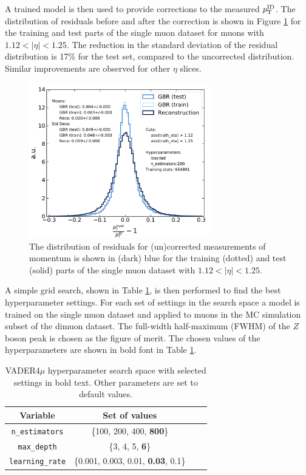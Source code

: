 A trained model is then used to provide corrections to the
measured $p_{\text{T}}^\text{ID}$. The distribution of residuals before and
after the correction is shown in Figure \ref{fig:muon:vader-single}
for the training and test parts of the single muon dataset for muons
with $1.12 < |\eta| < 1.25$. The reduction in the standard deviation
of the residual distribution is 17\% for the test set, compared to
the uncorrected distribution. Similar improvements are observed for
other $\eta$ slices.
\begin{figure}[h!]
  \centering
  \includegraphics[width=0.7\textwidth]{figures/muons/vader-single}
  \caption[VADER4$\mu$ correction on the single muon dataset]
  {The distribution of residuals for (un)corrected measurements of
  momentum is shown in (dark) blue for the training (dotted)
  and test (solid) parts of the single muon dataset with
  $1.12 < |\eta| < 1.25$.}
  \label{fig:muon:vader-single}
\end{figure}
A simple grid search, shown in Table \ref{tab:muon:grid}, is then
performed to find the best hyperparameter settings. For each 
set of settings in the search space a 
model is trained on the single muon dataset and applied to muons
in the MC simulation subset of the dimuon dataset. The full-width
half-maximum (FWHM) of the $Z$ boson peak is chosen as the figure of
merit. The chosen values of the hyperparameters are shown in bold
font in Table \ref{tab:muon:grid}.
\begin{table}[h]
\centering
\caption{VADER4$\mu$ hyperparameter search space with selected settings
in bold text. Other parameters are set to default values.}
\label{tab:muon:grid}
\begin{tabular}{c c c c }
\toprule
\midrule
Variable & Set of values \\
\midrule
\texttt{n\_estimators} & \{100, 200, 400, \textbf{800}\} \\
\texttt{max\_depth} & \{3, 4, 5, \textbf{6}\} \\
\texttt{learning\_rate} & \{0.001, 0.003, 0.01, \textbf{0.03}, 0.1\} \\
\midrule
\bottomrule
\end{tabular}
\end{table}
